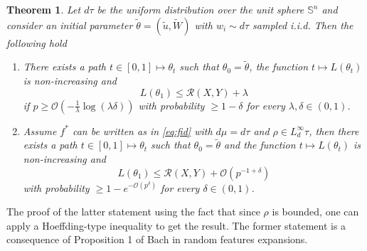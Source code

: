 \documentclass[11pt]{article} %
\newtheorem{theorem}{Theorem}[section]
\begin{document}
\begin{theorem}
	Let $d\tau$ be the uniform distribution over the unit sphere $\mathbb{S}^n$ and consider an initial parameter $\tilde \theta = (\tilde u, \tilde W)$ with $w_i\sim d\tau$ sampled i.i.d. Then the following hold
	\begin{enumerate}
		\item There exists a path $t\in[0,1] \mapsto \theta_t$ such that $\theta_0 = \tilde \theta$, the function $t\mapsto L(\theta_t)$ is non-increasing and 
			\begin{equation}
				L(\theta_1) \leq \mathcal{R}(X,Y) + \lambda
			\end{equation}
			if $p\geq \mathcal{O}(-\frac{1}{\lambda}\log(\lambda \delta))$ with probability $\geq 1-\delta$ for every $\lambda, \delta \in (0,1)$.
		\item Assume $f^*$ can be written as in \ref{eq:fid} with $d\mu = d\tau$ and $\rho \in L^\infty_d\tau$, then there exists a path $t\in [0,1] \mapsto \theta_t$ such that $\theta_0 = \tilde \theta$ and the function $t\mapsto L(\theta_t)$ is non-increasing and 
			\begin{equation}
				L(\theta_1) \leq \mathcal{R}(X,Y) + \mathcal{O}(p^{-1+\delta})
			\end{equation}
			with probability $\geq 1 - e^{-\mathcal{O}(p^\delta)}$ for every $\delta \in (0,1)$.
	\end{enumerate}
\end{theorem}
The proof of the latter statement using the fact that since $\rho$ is bounded, one can apply a Hoeffding-type inequality to get the result.
The former statement is a consequence of Proposition 1 of Bach in random features expansions.
\end{document}
